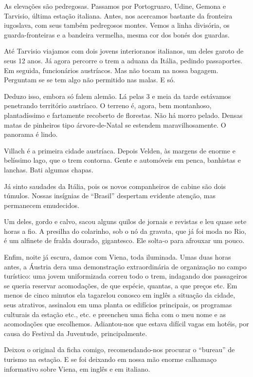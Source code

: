 As elevações são pedregosas. Passamos por Portogruaro, Udine, Gemona e Tarvisio, última estação italiana. Antes, nos acercamos bastante da fronteira iugoslava, com seus também pedregosos montes. Vemos a linha divisória, os guarda-fronteiras e a bandeira vermelha, mesma cor dos bonés dos guardas.

Até Tarvisio viajamos com dois jovens interioranos italianos, um deles garoto de seus 12 anos. Já agora percorre o trem a aduana da Itália, pedindo passaportes. Em seguida, funcionários austríacos. Mas não tocam na nossa bagagem. Perguntam se se tem algo não permitido nas malas. E só.

Deduzo isso, embora só falem alemão. Lá pelas 3 e meia da tarde estávamos penetrando território austríaco. O terreno é, agora, bem montanhoso, plantadíssimo e fartamente recoberto de florestas. Não há morro pelado. Densas matas de pinheiros tipo árvore-de-Natal se estendem maravilhosamente. O panorama é lindo.

Villach é a primeira cidade austríaca. Depois Velden, às margens de enorme e belíssimo lago, que o trem contorna. Gente e automóveis em penca, banhistas e lanchas. Bati algumas chapas.

Já sinto saudades da Itália, pois os novos companheiros de cabine são dois túmulos. Nossas insígnias de ``Brasil'' despertam evidente atenção, mas permanecem emudecidos.

Um deles, gordo e calvo, sacou alguns quilos de jornais e revistas e leu quase sete horas a fio. A presilha do colarinho, sob o nó da gravata, que já foi moda no Rio, é um alfinete de fralda dourado, gigantesco. Ele solta-o para afrouxar um pouco.

Enfim, noite já escura, damos com Viena, toda iluminada. Umas duas horas antes, a Áustria dera uma demonstração extraordinária de organização no campo turístico: uma jovem uniformizada correu todo o trem, indagando dos passageiros se queria reservar acomodações, de que espécie, quantas, a que preços etc. Em menos de cinco minutos ela tagarelou conosco em inglês a situação da cidade, seus atrativos, assinalou em uma planta os edifícios principais, os programas culturais da estação etc., etc. e preencheu uma ficha com o meu nome e as acomodações que escolhemos. Adiantou-nos que estava difícil vagas em hotéis, por causa do Festival da Juventude, principalmente.

Deixou o original da ficha comigo, recomendando-nos procurar o ``bureau'' de turismo na estação. E se foi deixando em nossa mão enorme calhamaço informativo sobre Viena, em inglês e em italiano.


